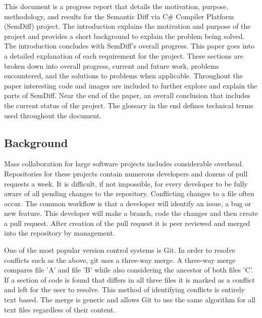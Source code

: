 \documentclass[draftclsnofoot,onecolumn]{IEEEtran}
\begin{document}
This document is a progress report that details the motivation, purpose, 
methodology, and results for the Semantic Diff via C\# Compiler Platform 
(SemDiff) project. The introduction explains the motivation and purpose of 
the project and provides a short background to explain the problem being 
solved. The introduction concludes with SemDiff's overall progress. This 
paper goes into a detailed explanation of each requirement for the project. 
These sections are broken down into overall progress, current and future 
work, problems encountered, and the solutions to problems when applicable. 
Throughout the paper interesting code and images are included to further 
explore and explain the parts of SemDiff. Near the end of the paper, an 
overall conclusion that includes the current status of the project. The 
glossary in the end defines technical terms used throughout the document.

\subsection{Background}
Mass collaboration for large software projects includes considerable 
overhead. Repositories for these projects contain numerous developers and 
dozens of pull requests a week. It is difficult, if not impossible, for 
every developer to be fully aware of all pending changes to the repository. 
Conflicting changes to a file often occur. The common workflow is that a 
developer will identify an issue, a bug or new feature. This developer will 
make a branch, code the changes and then create a pull request. After 
creation of the pull request it is peer reviewed and merged into the 
repository by management.

One of the most popular version control systems is Git. In order to resolve 
conflicts such as the above, git uses a three-way merge. A three-way merge 
compares file 'A' and file 'B' while also considering the ancestor of both 
files 'C'. If a section of code is found that differs in all three files it 
is marked as a conflict and left for the user to resolve. This method of 
identifying conflicts is entirely text based. The merge is generic and 
allows Git to use the same algorithm for all text files regardless of their 
content.
\end{document}
